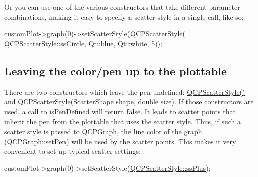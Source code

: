 Or you can use one of the various constructors that take different parameter combinations, making it easy to specify a scatter style in a single call, like so\+: 
\begin{DoxyCode}
customPlot->graph(0)->setScatterStyle(\hyperlink{class_q_c_p_scatter_style_a8836018d9ad83ccd8870de8315c1be73}{QCPScatterStyle}(
      \hyperlink{class_q_c_p_scatter_style_adb31525af6b680e6f1b7472e43859349a7c92a110880d0ef2170dff3a5b4f7779}{QCPScatterStyle::ssCircle}, Qt::blue, Qt::white, 5));
\end{DoxyCode}
\hypertarget{class_q_c_p_scatter_style_QCPScatterStyle-undefinedpen}{}\subsection{Leaving the color/pen up to the plottable}\label{class_q_c_p_scatter_style_QCPScatterStyle-undefinedpen}
There are two constructors which leave the pen undefined\+: \hyperlink{class_q_c_p_scatter_style_a8836018d9ad83ccd8870de8315c1be73}{Q\+C\+P\+Scatter\+Style()} and \hyperlink{class_q_c_p_scatter_style_a003d92f74f4561eda111862eadd62f28}{Q\+C\+P\+Scatter\+Style(\+Scatter\+Shape shape, double size)}. If those constructors are used, a call to \hyperlink{class_q_c_p_scatter_style_a7f1385a8d5e4f349a6b8030723fbd0f7}{is\+Pen\+Defined} will return false. It leads to scatter points that inherit the pen from the plottable that uses the scatter style. Thus, if such a scatter style is passed to \hyperlink{class_q_c_p_graph}{Q\+C\+P\+Graph}, the line color of the graph (\hyperlink{class_q_c_p_abstract_plottable_ab74b09ae4c0e7e13142fe4b5bf46cac7}{Q\+C\+P\+Graph\+::set\+Pen}) will be used by the scatter points. This makes it very convenient to set up typical scatter settings\+:


\begin{DoxyCode}
customPlot->graph(0)->setScatterStyle(\hyperlink{class_q_c_p_scatter_style_adb31525af6b680e6f1b7472e43859349a2d7f1d3c1a148b9d9d17f2fd9cae5eb7}{QCPScatterStyle::ssPlus});
\end{DoxyCode}


